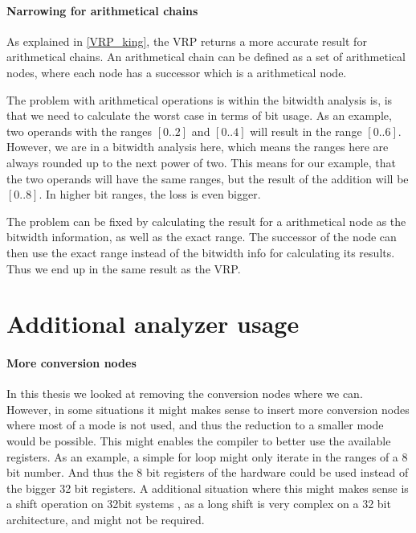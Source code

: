 \paragraph{Narrowing for arithmetical chains}
As explained in \ref{VRP_king}, the VRP returns a more accurate result for arithmetical chains. An arithmetical chain can be defined as a set of arithmetical nodes, where each node has a successor which is a arithmetical node.

The problem with arithmetical operations is within the bitwidth analysis is, is that we need to calculate the worst case in terms of bit usage. As an example, two operands with the ranges $[0..2]$ and $[0..4]$ will result in the range $[0..6]$. However, we are in a bitwidth analysis here, which means the ranges here are always rounded up to the next power of two. This means for our example, that the two operands will have the same ranges, but the result of the addition will be $[0..8]$. In higher bit ranges, the loss is even bigger.

The problem can be fixed by calculating the result for a arithmetical node as the bitwidth information, as well as the exact range. The successor of the node can then use the exact range instead of the bitwidth info for calculating its results. Thus we end up in the same result as the VRP.

\section{Additional analyzer usage}
\paragraph{More conversion nodes}
In this thesis we looked at removing the conversion nodes where we can. However, in some situations it might makes sense to insert more conversion nodes where most of a mode is not used, and thus the reduction to a smaller mode would be possible. This might enables the compiler to better use the available registers. As an example, a simple for loop might only iterate in the ranges of a 8 bit number. And thus the 8 bit registers of the hardware could be used instead of the bigger 32 bit registers. A additional situation where this might makes sense is a shift operation on 32bit systems , as a long shift is very complex on a 32 bit architecture, and might not be required.